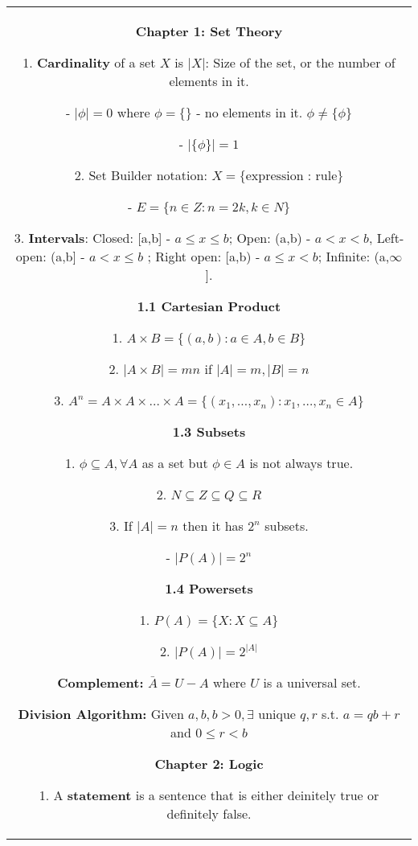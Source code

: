 \documentclass[a4paper]{article}
\begin{document}
    \pagestyle{empty}%
    \noindent
    \begin{tabular}{@{}c@{}}
    \begin{minipage}[t][\paperheight][t]{0.49\paperwidth}%
        \textbf{Chapter 1: Set Theory}

        1. \textbf{Cardinality} of a set $X$ is $|X|$: Size of the set, or the number of elements in it.
        
        \quad - $|\phi| = 0$ where $\phi = \{\}$ - no elements in it. $\phi \ne \{\phi\}$
          
        \quad- $|\{\phi\}| = 1$

        2. Set Builder notation: $X = \{\text{expression : rule}\}$

        \quad -  $E = \{n \in Z: n = 2k, k \in N\}$ 
        
        3. \textbf{Intervals}: Closed: [a,b] - $a \le x \le b$; Open: (a,b) -  $a < x < b$, Left-open: (a,b] -  $a < x \le b$ ; Right open: [a,b) - $a \le x < b$; Infinite: (a,$\infty$].
        
        \textbf{1.1 Cartesian Product}

        1. $A \times  B = \{(a,b): a\in A, b \in B\}$ 
        
        2. $| A \times  B | = mn$ if $|A| = m, |B| = n$

        3.  $A^n = A \times A \times \dots \times  A = \{(x_1,\dots,x_n): x_1,\dots,x_n \in A\}$ 
        
        \textbf{1.3 Subsets}

        1. $\phi \subseteq A, \forall A$ as a set but $\phi \in A$ is not always true.

        2.  $N \subseteq Z \subseteq Q \subseteq R$

        3.  If $|A| = n$ then it has $2^{n}$ subsets.
        
        \quad  - $|P(A)| = 2^n$

        
        \textbf{1.4 Powersets}

        1. $P(A) = \{X: X \subseteq A\}$

        2.  $|P(A)| = 2^{|A|}$

        \textbf{Complement:} $\bar A = U - A$ where  $U$ is a universal set.

        \textbf{Division Algorithm:} Given $a,b, b > 0, \exists $ unique  $q,r$ s.t.  $a = qb + r$ and  $ 0 \le r < b$


        \textbf{Chapter 2: Logic}
        
        1. A \textbf{statement} is a sentence that is either deinitely true or definitely false.
        

\end{minipage}
\end{tabular}
\end{document}
